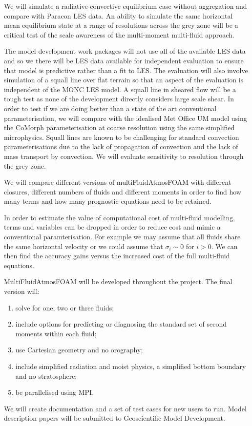 \documentclass[11pt,a4paper]{article}
\begin{document}
We will simulate a radiative-convective equilibrium case without aggregation and compare with Paracon LES data. An ability to simulate the same horizontal mean equilibrium state at a range of resolutions across the grey zone will be a critical test of the scale awareness of the multi-moment multi-fluid approach.


The model development work packages will not use all of the available LES data and so we there will be LES data available for independent evaluation to ensure that model is predictive rather than a fit to LES. The evaluation will also involve simulation of a squall line over flat terrain \cite[]{FM06} so that an aspect of the evaluation is independent of the MONC LES model. A squall line in sheared flow will be a tough test as none of the development directly considers large scale shear. In order to test if we are doing better than a state of the art conventional parameterisation, we will compare with the idealised Met Office UM model using the CoMorph parameterisation at coarse resolution using the same simplified microphysics. Squall lines are known to be challenging for standard convection parameterisations \cite[e.g.][]{LCD+08} due to the lack of propagation of convection and the lack of mass transport by convection. We will evaluate sensitivity to resolution through the grey zone. 

We will compare different versions of multiFluidAtmosFOAM with different closures, different numbers of fluids and different moments in order to find how many terms and how many prognostic equations need to be retained. 

In order to estimate the value of computational cost of multi-fluid modelling, terms and variables can be dropped in order to reduce cost and mimic a conventional paramterisation. For example we may assume that all fluids share the same horizontal velocity or we could assume that $\sigma_i\sim 0$ for $i>0$. We can then find the accuracy gains versus the increased cost of the full multi-fluid equations.


MultiFluidAtmosFOAM will be developed throughout the project. The final version will:
\begin{enumerate}
\item solve for one, two or three fluids;
\item include options for predicting or diagnosing the standard set of second moments within each fluid;
\item use Cartesian geometry and no orography;
\item include simplified radiation and moist physics, a simplified bottom boundary and no stratosphere;
\item be parallelised using MPI.
\end{enumerate}
We will create documentation and a set of test cases for new users to run. Model description papers will be submitted to Geoscientific Model Development.
\end{document}
